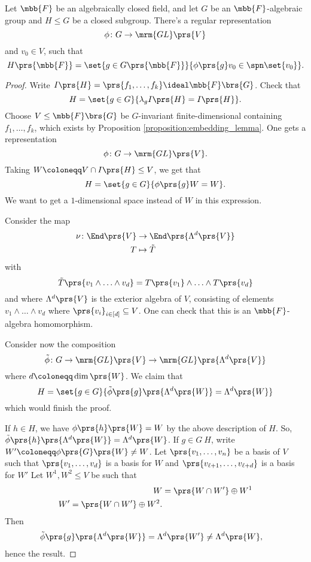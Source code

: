 \documentclass[10pt,a4paper,twoside,openany,hidelinks]{book}
\begin{document}
\begin{proposition}
Let $\mbb{F}$ be an algebraically closed field, and let $G$ be an $\mbb{F}$-algebraic group and $H \leq G$ be a closed subgroup.
There's a regular representation
\[\phi \colon G \to \mrm{GL}\prs{V}\]
and $v_0 \in V$,
such that
\[H\prs{\mbb{F}} = \set{g \in G\prs{\mbb{F}}}{\phi\prs{g} v_0 \in \spn\set{v_0}} \text{.}\]
\end{proposition}

\begin{proof}
Write $I\prs{H} = \prs{f_1, \ldots, f_k} \ideal \mbb{F}\brs{G}$.
Check that
\[H = \set{g \in G}{\lambda_g I\prs{H} = I\prs{H}} \text{.}\]
Choose $V \leq \mbb{F}\brs{G}$ be $G$-invariant finite-dimensional containing $f_1, \ldots, f_k$, which exists by Proposition \ref{proposition:embedding_lemma}.
One gets a representation
\[\phi \colon G \to \mrm{GL}\prs{V} \text{.}\]
Taking $W \coloneqq V \cap I\prs{H} \leq V$, we get that
\[H = \set{g \in G}{\phi\prs{g} W = W} \text{.}\]
We want to get a $1$-dimensional space instead of $W$ in this expression.

Consider the map
\begin{align*}
\nu \colon \End\prs{V} &\to \End\prs{\Lambda^d\prs{V}} \\
T &\mapsto \tilde{T}
\end{align*}
with
\[\tilde{T}\prs{v_1 \wedge \ldots \wedge v_d} = T\prs{v_1} \wedge \ldots \wedge T\prs{v_d}\]
and where $\Lambda^d\prs{V}$ is the exterior algebra of $V$, consisting of elements $v_1 \wedge \ldots \wedge v_d$ where $\prs{v_i}_{i \in [d]} \subseteq V$. One can check that this is an $\mbb{F}$-algebra homomorphism.

Consider now the composition
\[\tilde{\phi} \colon G \to \mrm{GL}\prs{V} \to \mrm{GL}\prs{\Lambda^d\prs{V}}\]
where $d \coloneqq \dim\prs{W}$.
We claim that
\[H = \set{g \in G}{\tilde{\phi}\prs{g}\prs{\Lambda^d\prs{W}} = \Lambda^d\prs{W}}\]
which would finish the proof.

If $h \in H$, we have $\phi\prs{h}\prs{W} = W$ by the above description of $H$. So, $\tilde{\phi}\prs{h} \prs{\Lambda^d\prs{W}} = \Lambda^d\prs{W}$.
If $g \in G \ H$, write $W' \coloneqq \phi\prs{G}\prs{W} \neq W$. Let $\prs{v_1, \ldots, v_n}$ be a basis of $V$ such that $\prs{v_1, \ldots, v_d}$ is a basis for $W$ and $\prs{v_{\ell+1}, \ldots, v_{\ell + d}}$ is a basis for $W'$ Let $W^1, W^2 \leq V$ be such that
\begin{align*}
W &= \prs{W \cap W'} \oplus W^1 \\
W' = \prs{W \cap W'} \oplus W^2 \text{.}
\end{align*}
Then
\begin{align*}
\tilde{\phi}\prs{g}\prs{\Lambda^d\prs{W}} &= \Lambda^d\prs{W'} \neq \Lambda^d\prs{W} \text{,}
\end{align*}
hence the result.
\end{proof}
\end{document}
